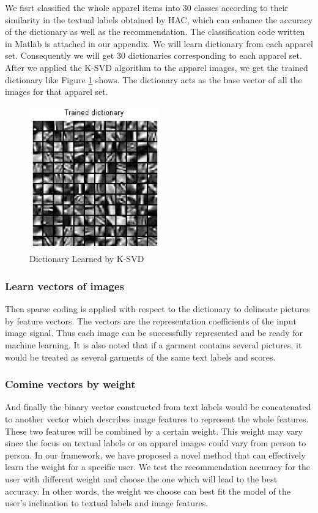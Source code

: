 We fisrt classified the whole apparel items into 30 classes according to their similarity in the textual labels obtained by HAC, which can enhance the accuracy of the dictionary as well as the recommendation. The classification code written in Matlab is attached in our appendix. We will learn dictionary from each apparel set. Consequently we will get 30 dictionaries corresponding to each apparel set. After we applied the K-SVD algorithm to the apparel images, we get the trained dictionary like Figure \ref{fig:dict} shows. The dictionary acts as the base vector of all the images for that apparel set.


\begin{figure}
  \centering
  \includegraphics[width=0.5\textwidth]{Trained_dic}
  \caption{Dictionary Learned by K-SVD}
  \label{fig:dict}
\end{figure}


\subsubsection{Learn vectors of images}
Then sparse coding is applied with respect to the dictionary to delineate pictures by feature vectors. The vectors are the representation coefficients of the input image signal. Thus each image can be successfully represented and be ready for machine learning. It is also noted that if a garment contains several pictures, it would be treated as several garments of the same text labels and scores.
  
\subsubsection{Comine vectors by weight}
And finally the binary vector constructed from text labels would be concatenated to another vector which describes image features to represent the whole features. These two features will be combined by a certain weight. This weight may vary since the focus on textual labels or on apparel images could vary from person to person. In our framework, we have proposed a novel method that can effectively learn the weight for a specific user. We test the recommendation
accuracy for the user with different weight and choose the one which will lead to the best accuracy. In other words, the weight we choose can best fit the model of the user's inclination to textual labels and image features.

